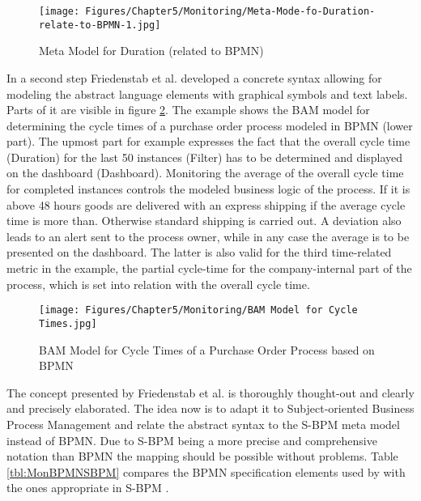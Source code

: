 \begin{figure}[htbp]
	\centering
	\texttt{[image: Figures/Chapter5/Monitoring/Meta-Mode-fo-Duration-relate-to-BPMN-1.jpg]}
	\caption[Meta Model for Duration (related to BPMN) 12]{Meta Model for Duration (related to BPMN) \cite{article:BPMNActivityMon}}
	\label{fig:Meta-Model}
\end{figure}


In a second step Friedenstab et al. developed a concrete syntax allowing for modeling the abstract language elements with graphical symbols and text labels. Parts of it are visible in figure \ref{fig:Model-Cycle-Times}. The example shows the BAM model for determining the cycle times of a purchase order process modeled in BPMN (lower part). The upmost part for example expresses the fact that the overall cycle time (Duration) for the last 50 instances (Filter) has to be determined and displayed on the dashboard (Dashboard). Monitoring the average of the overall cycle time for completed instances controls the modeled business logic of the process. If it is above 48 hours goods are delivered with an express shipping if the average cycle time is more than. Otherwise standard shipping is carried out. A deviation also leads to an alert sent to the process owner, while in any case the average is to be presented on the dashboard. The latter is also valid for the third time-related metric in the example, the partial cycle-time for the company-internal part of the process, which is set into relation with the overall cycle time.

\begin{figure}[htbp]
	\centering
	\texttt{[image: Figures/Chapter5/Monitoring/BAM Model for Cycle Times.jpg]}
	\caption[BAM Model for Cycle Times of a Purchase Order Process based on BPMN 12]{BAM Model for Cycle Times of a Purchase Order Process based on BPMN \cite{article:BPMNActivityMon}}
	\label{fig:Model-Cycle-Times}
\end{figure}


The concept presented by Friedenstab et al. is thoroughly thought-out and clearly and precisely elaborated. The idea now is to adapt it to Subject-oriented Business Process Management and relate the abstract syntax to the S-BPM meta model instead of BPMN. Due to S-BPM being a more precise and comprehensive notation than BPMN \cite{article:BPMNYAWLPatterns} the mapping should be possible without problems. Table \ref{tbl:MonBPMNSBPM} compares the BPMN specification elements used by \cite{article:BPMNActivityMon} with the ones appropriate in S-BPM \cite{Flei12}.


